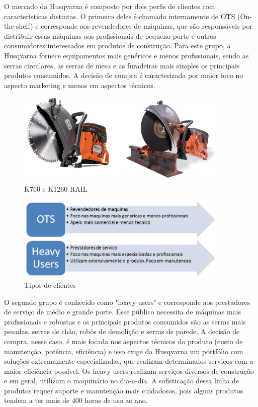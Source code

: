 \documentclass[12pt]{article}
\begin{document}
	O mercado da Husqvarna é composto por dois perfis de clientes com características distintas. O primeiro deles é chamado internamente de OTS (On-the-shelf) e corresponde aos revendedores de máquinas, que são responsáveis por distribuir essas máquinas aos profissionais de pequeno porte e outros consumidores interessados em produtos de construção. Para este grupo, a Husqvarna fornece equipamentos mais genéricos e menos profissionais, sendo as serras circulares, as serras de mesa e as furadeiras mais simples os principais produtos consumidos. A decisão de compra é caracterizada por maior foco no aspecto marketing e menos em aspectos técnicos.

\begin{figure}[h!]
	\centering
	\includegraphics[width=0.9\textwidth]{img/k760-vs-k1260rail.png}
	\caption{K760 e K1260 RAIL}
	\label{fig:k700vsk1260}
\end{figure}

\begin{figure}[h!]
	\centering
	\includegraphics[width=0.9\textwidth]{img/clientes.png}
	\caption{Tipos de clientes}
	\label{fig:tipo-clientes}
\end{figure}

	O segundo grupo é conhecido como "heavy users" e corresponde aos prestadores de serviço de médio e grande porte. Esse público necessita de máquinas mais profissionais e robustas e os principais produtos consumidos são as serras mais pesadas, serras de chão, robôs de demolição e serras de parede. A decisão de compra, nesse caso, é mais focada nos aspectos técnicos do produto (custo de manutenção, potência, eficiência) e isso exige da Husqvarna um portfólio com soluções extremamente especializadas, que realizam determinados serviços com a maior eficiência possível. Os heavy users realizam serviços diversos de construção e em geral, utilizam o maquinário no dia-a-dia. A sofisticação dessa linha de produtos requer suporte e manutenção mais cuidadosos, pois alguns produtos tendem a ter mais de 400 horas de uso ao ano. 
	
\end{document}
